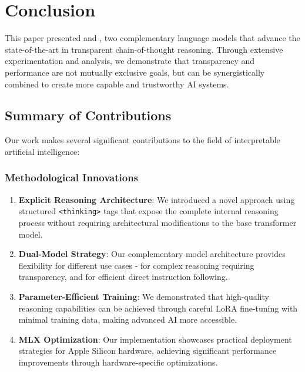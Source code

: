 \section{Conclusion}
\label{sec:conclusion}

This paper presented \supra{} and \zennano{}, two complementary language models that advance the state-of-the-art in transparent chain-of-thought reasoning. Through extensive experimentation and analysis, we demonstrate that transparency and performance are not mutually exclusive goals, but can be synergistically combined to create more capable and trustworthy AI systems.

\subsection{Summary of Contributions}

Our work makes several significant contributions to the field of interpretable artificial intelligence:

\subsubsection{Methodological Innovations}
\begin{enumerate}
    \item \textbf{Explicit Reasoning Architecture}: We introduced a novel approach using structured \texttt{<thinking>} tags that expose the complete internal reasoning process without requiring architectural modifications to the base transformer model.
    
    \item \textbf{Dual-Model Strategy}: Our complementary model architecture provides flexibility for different use cases - \supra{} for complex reasoning requiring transparency, and \zennano{} for efficient direct instruction following.
    
    \item \textbf{Parameter-Efficient Training}: We demonstrated that high-quality reasoning capabilities can be achieved through careful LoRA fine-tuning with minimal training data, making advanced AI more accessible.
    
    \item \textbf{MLX Optimization}: Our implementation showcases practical deployment strategies for Apple Silicon hardware, achieving significant performance improvements through hardware-specific optimizations.
\end{enumerate}

